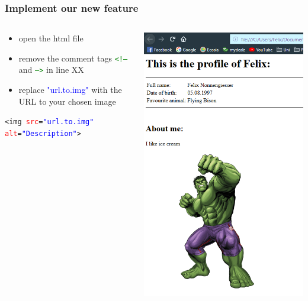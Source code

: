 \documentclass[aspectratio=169]{beamer}
\begin{document}

\begin{frame}
\frametitle{Implement our new feature}
	\begin{columns}[T]
		\begin{column}{0.7\textwidth}
				\begin{itemize}
					\item open the html file
					\item remove the comment tags \texttt{\textcolor{green}{<!--}} and \texttt{\textcolor{green}{-->}} in line  XX 
					\item replace \textcolor{blue}{"url.to.img"} with the URL to your chosen image
				\end{itemize}
				\vspace{.5cm}
				\texttt{<img \textcolor{red}{src}=\textcolor{blue}{"url.to.img"} \textcolor{red}{alt}=\textcolor{blue}{"Description"}>}
		\end{column}
		\begin{column}{0.3\textwidth}
				\includegraphics[width=.9\textwidth]{graphics/profile_with_picture.png}
		\end{column}
	\end{columns}
\end{frame}
\end{document}

